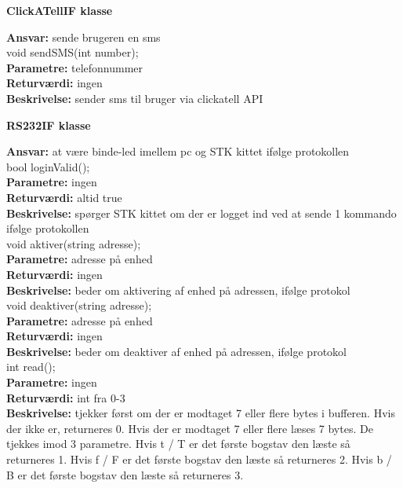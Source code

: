 \newpage

{\centering 
\textbf{ClickATellIF klasse}\par
}
\textbf{Ansvar:} sende brugeren en sms \\

void sendSMS(int number); \\
\textbf{Parametre:} telefonnummer \\
\textbf{Returværdi:} ingen \\
\textbf{Beskrivelse:} sender sms til bruger via clickatell API \\

{\centering 
\textbf{RS232IF klasse}\par
}
\textbf{Ansvar:} at være binde-led imellem pc og STK kittet ifølge protokollen \\

bool loginValid(); \\
\textbf{Parametre:} ingen \\
\textbf{Returværdi:} altid true\\
\textbf{Beskrivelse:} spørger STK kittet om der er logget ind ved at sende 1 kommando ifølge protokollen \\

void aktiver(string adresse); \\
\textbf{Parametre:} adresse på enhed \\
\textbf{Returværdi:} ingen \\
\textbf{Beskrivelse:} beder om aktivering af enhed på adressen, ifølge protokol \\

void deaktiver(string adresse); \\
\textbf{Parametre:} adresse på enhed \\
\textbf{Returværdi:} ingen \\
\textbf{Beskrivelse:} beder om deaktiver af enhed på adressen, ifølge protokol \\

int read(); \\
\textbf{Parametre:} ingen\\
\textbf{Returværdi:} int fra 0-3 \\
\textbf{Beskrivelse:} tjekker først om der er modtaget 7 eller flere bytes i bufferen. Hvis der ikke er, returneres 0. Hvis der er modtaget 7 eller flere læses 7 bytes. De tjekkes imod 3 parametre. Hvis t / T er det første bogstav den læste så returneres 1. Hvis f / F er det første bogstav den læste så returneres 2. Hvis b / B er det første bogstav den læste så returneres 3.  \\

